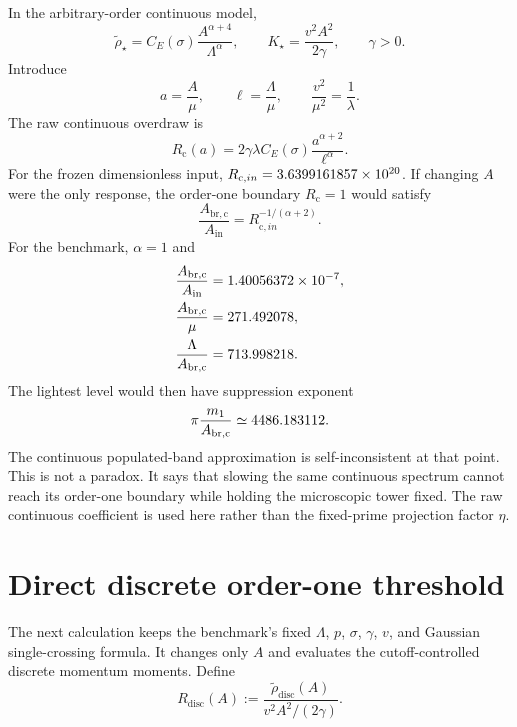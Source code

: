 In the arbitrary-order continuous model,
\begin{equation}
\widetilde\rho_\star
=C_E(\sigma)\frac{A^{\alpha+4}}{\Lambda^\alpha},
\qquad
K_\star=\frac{v^2A^2}{2\gamma},
\qquad \gamma>0.
\end{equation}
Introduce
\begin{equation}
a=\frac A\mu,
\qquad
\ell=\frac\Lambda\mu,
\qquad
\frac{v^2}{\mu^2}=\frac1\lambda.
\end{equation}
The raw continuous overdraw is
\begin{equation}
R_{\mathrm c}(a)
=2\gamma\lambda C_E(\sigma)
\frac{a^{\alpha+2}}{\ell^\alpha}.
\end{equation}
For the frozen dimensionless input, $R_{\mathrm c,in}=3.6399161857\times 10^{20}$.  If changing $A$ were the only response, the order-one boundary $R_{\mathrm c}=1$ would satisfy
\begin{equation}
\boxed{
\frac{A_{\mathrm{br,c}}}{A_{\mathrm{in}}}
=R_{\mathrm c,in}^{-1/(\alpha+2)}.}
\label{eq:back-cont-slow}
\end{equation}
For the benchmark, $\alpha=1$ and
\begin{align}
\frac{A_{\mathrm{br,c}}}{A_{\mathrm{in}}}
&=1.40056372\times 10^{-7},\\
\frac{A_{\mathrm{br,c}}}{\mu}
&=271.492078,\\
\frac{\Lambda}{A_{\mathrm{br,c}}}
&=713.998218.
\end{align}
The lightest level would then have suppression exponent
\begin{equation}
\pi\frac{m_1}{A_{\mathrm{br,c}}}
\simeq4486.183112.
\label{eq:back-cont-exponent}
\end{equation}
The continuous populated-band approximation is self-inconsistent at that point.  This is not a paradox.  It says that slowing the same continuous spectrum cannot reach its order-one boundary while holding the microscopic tower fixed.  The raw continuous coefficient is used here rather than the fixed-prime projection factor $\eta$.

\section{Direct discrete order-one threshold}

The next calculation keeps the benchmark's fixed $\Lambda$, $p$, $\sigma$, $\gamma$, $v$, and Gaussian single-crossing formula.  It changes only $A$ and evaluates the cutoff-controlled discrete momentum moments.  Define
\begin{equation}
R_{\mathrm{disc}}(A)
:=\frac{\widetilde\rho_{\mathrm{disc}}(A)}{v^2A^2/(2\gamma)}.
\label{eq:back-Rdisc}
\end{equation}

